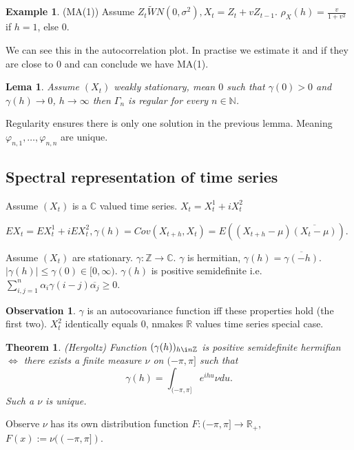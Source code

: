 \documentclass[12pt,a4paper]{amsart}
\theoremstyle{definition} %
\newtheorem{example}[defn]{Example}
\newtheorem{observation}[defn]{Observation}
\theoremstyle{plain} %
\newtheorem{lema}[defn]{Lema}
\newtheorem{theorem}[defn]{Theorem}
\newcommand{\R}{\mathbb R}
\newcommand{\N}{\mathbb N}
\newcommand{\Z}{\mathbb Z}
\newcommand{\C}{\mathbb C}
\begin{document}
\begin{example} (MA(1))
Assume $Z_t \tilde WN(0, \sigma^2), X_t = Z_t + v Z_{t-1}$.
$\rho_X(h) = \frac{v}{1+v^2}$ if $h = 1$, else $0$.

We can see this in the autocorrelation plot. In practise we estimate it and if they are close to $0$ and can conclude we have MA(1). 
\end{example}

\begin{lema}
Assume $(X_t)$ weakly stationary, mean $0$ such that $\gamma(0) > 0$ and $\gamma(h) \rightarrow 0$, $h \rightarrow \infty$ then $\Gamma_n$ is regular for every $n \in \N$. 
\end{lema}

Regularity ensures there is only one solution in the previous lemma. Meaning $\varphi_{n,1}, \dots, \varphi_{n,n}$ are unique. 


\subsection{Spectral representation of time series}

Assume $(X_t)$ is a $\C$ valued time series.
$X_t = X_t^1 + i X_t^2$

$EX_t = EX_t^1 + i EX_t^2, \gamma(h) = Cov(X_{t+h}, X_t) = E((X_{t+h} - \mu)\overline{(X_t - \mu)})$.

Assume $(X_t)$ are stationary. $\gamma: \Z \rightarrow \C$. $\gamma$ is hermitian, $\gamma(h) = \overline{\gamma(-h)}$. $|\gamma(h)| \leq \gamma(0) \in [0, \infty)$. $\gamma(h)$ is positive semidefinite i.e.
$\sum_{i,j = 1}^n \alpha_i \gamma(i-j)\overline{\alpha_j} \geq 0$.

\begin{observation}
$\gamma$ is an autocovariance function iff these properties hold (the first two).
$X_t^2$ identically equals $0$, nmakes $\R$ values time series special case. 
\end{observation}

\begin{theorem} (Hergoltz)
Function $(\gamma(h))_{h \i n\Z}$ is positive semidefinite hermifian $\Leftrightarrow$ there exists a finite measure $\nu$ on $(-\pi, \pi]$ such that $$\gamma(h) = \int_{(-\pi,\pi]} e^{i h u}\nu du.$$ 
Such a $\nu$ is unique.
\end{theorem}

Observe $\nu$ has its own distribution function $F : (-\pi, \pi] \rightarrow \R_+$, $F(x) := \nu((-\pi,\pi])$. 
\end{document}
